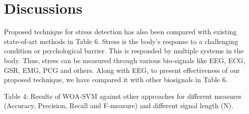 \documentclass{article}
\begin{document}
\section{Discussions}


Proposed technique for stress detection has also been compared with existing state-of-art methods in Table 6. Stress is the body’s response to a challenging condition or psychological barrier. This is responded by multiple systems in the body. Thus, stress can be measured through various bio-signals like EEG, ECG, GSR, EMG, PCG and others. Along with EEG, to present effectiveness of our proposed technique, we have compared it with other biosignals in Table 6.


Table 4: Results of WOA-SVM against other approaches for different measures (Accuracy, Precision, Recall and F-measure) and different signal length (N).
\end{document}
